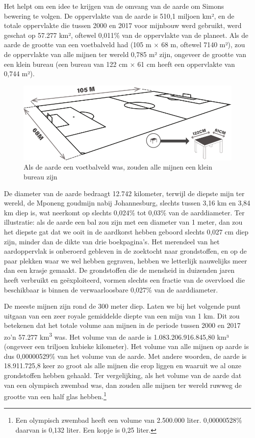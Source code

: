 Het helpt om een idee te krijgen van de omvang van de aarde om Simons
bewering te volgen. De oppervlakte van de aarde is 510,1 miljoen km², en
de totale oppervlakte die tussen 2000 en 2017 voor mijnbouw werd
gebruikt, werd geschat op 57.277 km², oftewel 0,011\% van de oppervlakte
van de planeet.\autocite{31} Als de
aarde de grootte van een voetbalveld had (105 m × 68 m, oftewel 7140 m²),
zou de oppervlakte van alle mijnen ter wereld 0,785 m² zijn, ongeveer de
grootte van een klein bureau (een bureau van 122 cm × 61 cm heeft een
oppervlakte van 0,744 m²).

\begin{figure}[!htb]
\centering
    \includegraphics[width=\textwidth]{figures/fig2-1.png}
\caption[Als de aarde een voetbalveld was, zouden alle mijnen
een klein bureau zijn]{Als de aarde een voetbalveld was, zouden alle mijnen
een klein bureau zijn}
\label{fig2}
\end{figure}

De diameter van de aarde bedraagt 12.742 kilometer, terwijl de diepste mijn ter wereld, de Mponeng goudmijn nabij Johannesburg, slechts tussen 3,16 km en 3,84 km diep is, wat neerkomt op slechts 0,024\% tot 0,03\% van de aarddiameter. Ter illustratie: als de aarde een bal zou zijn met een diameter van 1 meter, dan zou het diepste gat dat we ooit in de aardkorst hebben geboord slechts 0,027 cm diep zijn, minder dan de dikte van drie boekpagina’s. Het merendeel van het aardoppervlak is onberoerd gebleven in de zoektocht naar grondstoffen, en op de paar plekken waar we wel hebben gegraven, hebben we letterlijk nauwelijks meer dan een krasje gemaakt. De grondstoffen die de mensheid in duizenden jaren heeft verbruikt en geëxploiteerd, vormen slechts een fractie van de overvloed die beschikbaar is binnen de verwaarloosbare 0,027\% van de aarddiameter.

De meeste mijnen zijn rond de 300 meter diep. Laten we bij het volgende
punt uitgaan van een zeer royale gemiddelde diepte van een mijn van 1
km. Dit zou betekenen dat het totale volume aan mijnen in de periode
tussen 2000 en 2017 zo'n 57.277 km\textsuperscript{3} was. Het volume van de aarde is
1.083.206.916.845,80 km³ (ongeveer een triljoen kubieke kilometer). Het
volume van alle mijnen op aarde is dus 0,00000529\% van het volume van
de aarde. Met andere woorden, de aarde is 18.911.725,8 keer zo groot als
alle mijnen die erop liggen en waaruit we al onze grondstoffen hebben
gehaald. Ter vergelijking, als het volume van de aarde dat van een
olympisch zwembad was, dan zouden alle mijnen ter wereld ruwweg de
grootte van een half glas hebben.\footnote{Een olympisch zwembad heeft een volume van 2.500.000 liter. 0,00000528\% daarvan is 0,132 liter. Een kopje is 0,25 liter.}

